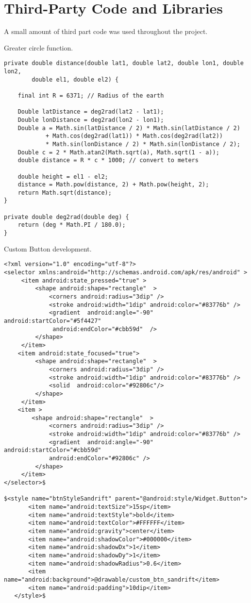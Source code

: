 \chapter{Third-Party Code and Libraries}
A small amount of third part code was used throughout the project.

Greater circle function.\cite{circlef}
\begin{lstlisting}
private double distance(double lat1, double lat2, double lon1, double lon2,
        double el1, double el2) {

    final int R = 6371; // Radius of the earth

    Double latDistance = deg2rad(lat2 - lat1);
    Double lonDistance = deg2rad(lon2 - lon1);
    Double a = Math.sin(latDistance / 2) * Math.sin(latDistance / 2)
            + Math.cos(deg2rad(lat1)) * Math.cos(deg2rad(lat2))
            * Math.sin(lonDistance / 2) * Math.sin(lonDistance / 2);
    Double c = 2 * Math.atan2(Math.sqrt(a), Math.sqrt(1 - a));
    double distance = R * c * 1000; // convert to meters

    double height = el1 - el2;
    distance = Math.pow(distance, 2) + Math.pow(height, 2);
    return Math.sqrt(distance);
}

private double deg2rad(double deg) {
    return (deg * Math.PI / 180.0);
}
\end{lstlisting}
\newpage
Custom Button development.\cite{button}
\begin{lstlisting}
<?xml version="1.0" encoding="utf-8"?>
<selector xmlns:android="http://schemas.android.com/apk/res/android" >
     <item android:state_pressed="true" >
         <shape android:shape="rectangle"  >
             <corners android:radius="3dip" />
             <stroke android:width="1dip" android:color="#83776b" />
             <gradient  android:angle="-90"  android:startColor="#5f4427"
              android:endColor="#cbb59d"  />            
         </shape>
     </item>
    <item android:state_focused="true">
         <shape android:shape="rectangle"  >
             <corners android:radius="3dip" />
             <stroke android:width="1dip" android:color="#83776b" />
             <solid  android:color="#92806c"/>       
         </shape>
     </item>  
    <item >
        <shape android:shape="rectangle"  >
             <corners android:radius="3dip" />
             <stroke android:width="1dip" android:color="#83776b" />
             <gradient  android:angle="-90"  android:startColor="#cbb59d" 
             android:endColor="#92806c" />            
         </shape>
     </item>
</selector>$

$<style name="btnStyleSandrift" parent="@android:style/Widget.Button">
       <item name="android:textSize">15sp</item>
       <item name="android:textStyle">bold</item>
       <item name="android:textColor">#FFFFFF</item>
       <item name="android:gravity">center</item>
       <item name="android:shadowColor">#000000</item>
       <item name="android:shadowDx">1</item>
       <item name="android:shadowDy">1</item>
       <item name="android:shadowRadius">0.6</item>
       <item name="android:background">@drawable/custom_btn_sandrift</item>
       <item name="android:padding">10dip</item>
   </style>$
   
\end{lstlisting}